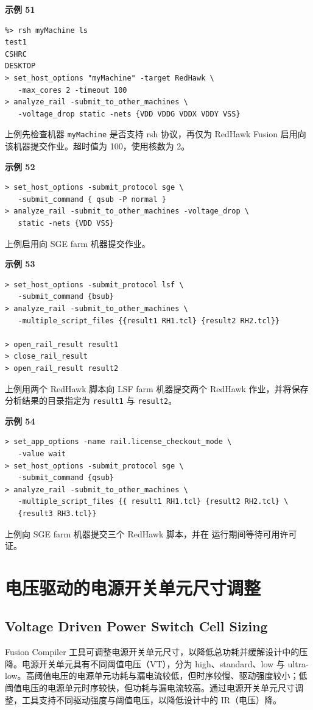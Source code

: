 \textbf{示例 51}
\begin{lstlisting}
%> rsh myMachine ls
test1
CSHRC
DESKTOP
> set_host_options "myMachine" -target RedHawk \
   -max_cores 2 -timeout 100
> analyze_rail -submit_to_other_machines \
   -voltage_drop static -nets {VDD VDDG VDDX VDDY VSS}
\end{lstlisting}
上例先检查机器 \texttt{myMachine} 是否支持 rsh 协议，再仅为 RedHawk Fusion 启用向该机器提交作业。超时值为 100，使用核数为 2。

\textbf{示例 52}
\begin{lstlisting}
> set_host_options -submit_protocol sge \
   -submit_command { qsub -P normal }
> analyze_rail -submit_to_other_machines -voltage_drop \
   static -nets {VDD VSS}
\end{lstlisting}
上例启用向 SGE farm 机器提交作业。

\textbf{示例 53}
\begin{lstlisting}
> set_host_options -submit_protocol lsf \
   -submit_command {bsub}
> analyze_rail -submit_to_other_machines \
   -multiple_script_files {{result1 RH1.tcl} {result2 RH2.tcl}}

> open_rail_result result1
> close_rail_result
> open_rail_result result2
\end{lstlisting}
上例用两个 RedHawk 脚本向 LSF farm 机器提交两个 RedHawk 作业，并将保存分析结果的目录指定为 \texttt{result1} 与 \texttt{result2}。

\textbf{示例 54}
\begin{lstlisting}
> set_app_options -name rail.license_checkout_mode \
   -value wait
> set_host_options -submit_protocol sge \
   -submit_command {qsub}
> analyze_rail -submit_to_other_machines \
   -multiple_script_files {{ result1 RH1.tcl} {result2 RH2.tcl} \
   {result3 RH3.tcl}}
\end{lstlisting}
上例向 SGE farm 机器提交三个 RedHawk 脚本，并在  运行期间等待可用许可证。

\section{电压驱动的电源开关单元尺寸调整}
\subsection*{Voltage Driven Power Switch Cell Sizing}

Fusion Compiler 工具可调整电源开关单元尺寸，以降低总功耗并缓解设计中的压降。电源开关单元具有不同阈值电压（VT），分为 high、standard、low 与 ultra-low。高阈值电压的电源单元功耗与漏电流较低，但时序较慢、驱动强度较小；低阈值电压的电源单元时序较快，但功耗与漏电流较高。通过电源开关单元尺寸调整，工具支持不同驱动强度与阈值电压，以降低设计中的 IR（电压）降。

